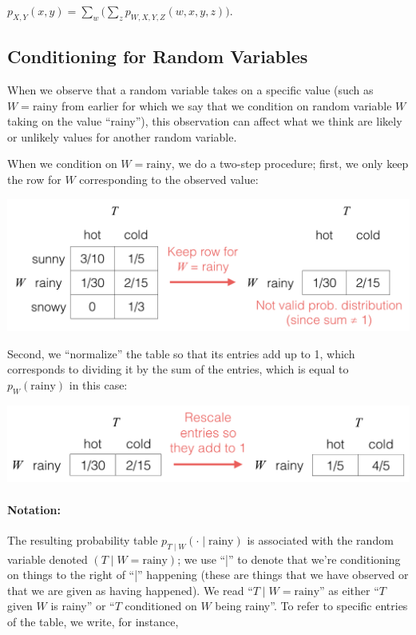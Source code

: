 \documentclass[6008notes.tex]{subfiles}
\begin{document}
{\centering$p_{X,Y}(x, y) = \sum _ w \Big( \sum _ z p_{W,X,Y,Z}(w,x,y,z) \Big).$ \par}
 
\subsection{Conditioning for Random Variables}

When we observe that a random variable takes on a specific value (such as $W=\text {rainy}$ from earlier for which we say that we condition on random variable $W$ taking on the value ``rainy''), this observation can affect what we think are likely or unlikely values for another random variable.

When we condition on $W=\text {rainy}$, we do a two-step procedure; first, we only keep the row for $W$ corresponding to the observed value:

{\centering\includegraphics[scale=0.4]{images_sec-joint-rv-cond-restrict} \par}

Second, we ``normalize'' the table so that its entries add up to 1, which corresponds to dividing it by the sum of the entries, which is equal to $p_{W}(\text {rainy})$ in this case:

{\centering\includegraphics[scale=0.4]{images_sec-joint-rv-cond-renormalize} \par}

\paragraph{Notation:} The resulting probability table $p_{T\mid W}(\cdot \mid \text {rainy})$ is associated with the random variable denoted $(T\mid W=\text {rainy})$; we use ``|'' to denote that we're conditioning on things to the right of ``|'' happening (these are things that we have observed or that we are given as having happened). We read ``$T\mid W=\text {rainy}$'' as either ``$T$ given $W$ is rainy'' or ``$T$ conditioned on $W$ being rainy''. To refer to specific entries of the table, we write, for instance,
\end{document}
